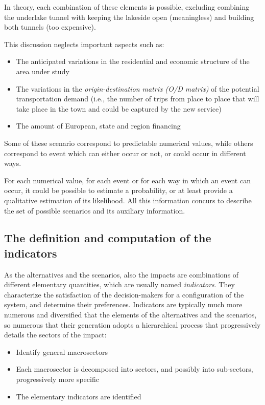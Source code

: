 In theory, each combination of these elements is possible, excluding combining the underlake tunnel with keeping the lakeside open (meaningless) and building both tunnels (too expensive).

This discussion neglects important aspects such as: 
\begin{itemize}
	\item The anticipated variations in the residential and economic structure of the area under study
	
	\item The variations in the \textit{origin-destination matrix (O/D matrix)} of the potential transportation demand (i.e., the number of trips from place to place that will take place in the town and could be captured by the new service)
	
	\item The amount of European, state and region financing
\end{itemize}

Some of these scenario correspond to predictable numerical values, while others correspond to event which can either occur or not, or could occur in different ways. 

For each numerical value, for each event or for each way in which an event can occur, it could be possible to estimate a probability, or at least provide a qualitative estimation of its likelihood. All this information concurs to describe the set of possible scenarios and its auxiliary information.

\subsection{The definition and computation of the indicators}
\label{subsec:comoindicators}

As the alternatives and the scenarios, also the impacts are combinations of different elementary quantities, which are usually named \textit{indicators}. They characterize the satisfaction of the decision-makers for a configuration of the system, and determine their preferences. Indicators are typically much more numerous and diversified that the elements of the alternatives and the scenarios, so numerous that their generation adopts a hierarchical process that progressively details the sectors of the impact: 
\begin{itemize}
	\item Identify general macrosectors
	
	\item Each macrosector is decomposed into sectors, and possibly into sub-sectors, progressively more specific
	
	\item The elementary indicators are identified
\end{itemize}

